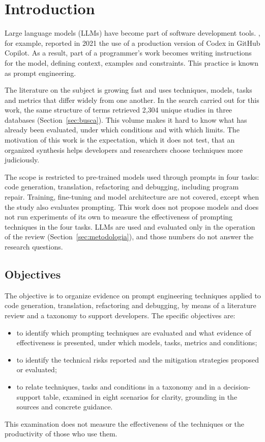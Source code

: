 \section{Introduction}
Large language models (LLMs) have become part of software development tools. \citet{chen2021codex}, for
example, reported in 2021 the use of a production version of Codex in GitHub Copilot. As a result,
part of a programmer's work becomes writing instructions for the model, defining
context, examples and constraints. This practice is known as prompt engineering.

The literature on the subject is growing fast and uses techniques, models, tasks and metrics that differ
widely from one another. In the search carried out for this work, the same structure of terms retrieved 2,304
unique studies in three databases (Section~\ref{sec:busca}). This volume makes it hard to know what has already
been evaluated, under which conditions and with which limits. The motivation of this work is the expectation, which it
does not test, that an organized synthesis helps developers and researchers choose techniques
more judiciously.

The scope is restricted to pre-trained models used through prompts in four tasks: code generation,
translation, refactoring and debugging, including program repair. Training, fine-tuning
and model architecture are not covered, except when the study also evaluates prompting.
This work does not propose models and does not run experiments of its own to measure the effectiveness of
prompting techniques in the four tasks. LLMs are used and evaluated only in the operation of the review
(Section~\ref{sec:metodologia}), and those numbers do not answer the research questions.

\subsection{Objectives}
The objective is to organize evidence on prompt engineering techniques applied to code generation,
translation, refactoring and debugging, by means of a literature review and a
taxonomy to support developers. The specific objectives are:
\begin{itemize}
  \item to identify which prompting techniques are evaluated and what evidence of effectiveness is
  presented, under which models, tasks, metrics and conditions;
  \item to identify the technical risks reported and the mitigation strategies proposed or evaluated;
  \item to relate techniques, tasks and conditions in a taxonomy and in a decision-support table,
  examined in eight scenarios for clarity, grounding in the sources and concrete guidance.
\end{itemize}
This examination does not measure the effectiveness of the techniques or the productivity of those who use them.

